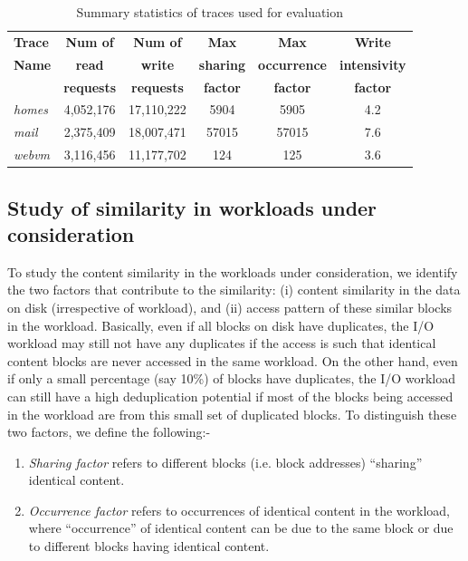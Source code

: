 \begin{table}
\centering
\caption{Summary statistics of traces used for evaluation}
\begin{tabular}{|l|c|c|c|c|c|} \hline
\textbf{Trace} & \textbf{Num of} & \textbf{Num of} & \textbf{Max} & \textbf{Max} & \textbf{Write} \\
\textbf{Name} & \textbf{read} & \textbf{write} & \textbf{sharing} & \textbf{occurrence} & \textbf{intensivity} \\
\textbf{} & \textbf{requests} & \textbf{requests} & \textbf{factor} & \textbf{factor} & \textbf{factor}  \\ \hline
\textit{homes} & 4,052,176 & 17,110,222 & 5904 & 5905 & 4.2 \\ \hline
\textit{mail} & 2,375,409 & 18,007,471 & 57015 & 57015 & 7.6 \\ \hline
\textit{webvm} & 3,116,456 & 11,177,702 & 124 & 125 & 3.6 \\ \hline
\end{tabular}
\label{tab:stat-summary}
\end{table}

\subsection{Study of similarity in workloads under consideration}
\label{sec:similarity-study}

To study the content similarity in the workloads under consideration,
we identify the two factors that contribute to the similarity: 
(i) content similarity in the data on disk (irrespective of workload), 
and (ii) access pattern of these similar blocks in the workload.
Basically, even if all blocks on disk have duplicates, the I/O workload
may still not have any duplicates if the access is such that identical
content blocks are never accessed in the same workload. On the other
hand, even if only a small percentage (say 10\%) of blocks have duplicates, 
the I/O workload can still have a high deduplication potential if
most of the blocks being accessed in the workload are from this
small set of duplicated blocks. To distinguish these two factors,
we define the following:-

\begin{enumerate}
\item \textit{Sharing factor} refers to different
blocks (i.e. block addresses) ``sharing'' identical content.
\item \textit{Occurrence factor} refers to occurrences of identical content
in the workload, %
where ``occurrence'' of identical content can be due to the
same block or due to different blocks having identical content. 
\end{enumerate}

